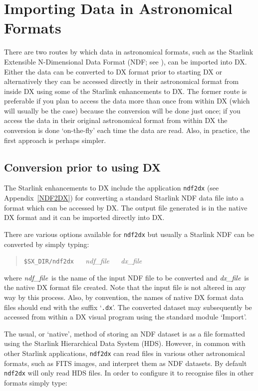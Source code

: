 \section{Importing Data in Astronomical Formats
\label{IMPORTING}  }

There are two routes by which data in astronomical formats, such
as the Starlink Extensible N-Dimensional Data Format (NDF; see 
\cite{SUN33}), can be imported into DX. Either the
data can be converted to DX format prior to starting DX or alternatively
they can be accessed directly in their astronomical format from inside DX
using some of the Starlink enhancements to DX. The former route is
preferable if you plan to access the data more than once from within DX
(which will usually be the case) because the conversion will be done just
once; if you access the data in their original astronomical format from
within DX the conversion is done `on-the-fly' each time the data are read.
Also, in practice, the first approach is perhaps simpler.

\subsection{Conversion prior to using DX \label{PRIOR} }

The Starlink enhancements to DX include the application {\tt ndf2dx} (see
Appendix~\ref{NDF2DX}) for converting a standard Starlink NDF data file
into a format which can be accessed by DX. The output file generated is
in the native DX format and it can be imported directly into DX.

There are various options available for {\tt ndf2dx} 
but usually a Starlink NDF can be
converted by simply typing:

\begin{quote}
{\tt \$SX\_DIR/ndf2dx} ~~ {\it ndf\_file} ~~ {\it dx\_file}
\end{quote}

where {\it ndf\_file}\, is the name of the input NDF file to be
converted and  {\it dx\_file}\, is the native DX format file created.
Note that the input file is not altered in any way by this process.
Also, by convention, the names of native DX format data files should end
with the suffix `{\tt .dx}'. The converted dataset may subsequently be
accessed from within a DX visual program using the standard module
`Import'.

The usual, or `native', method of storing an NDF dataset is as a file
formatted using the Starlink Hierarchical Data System (HDS). However,
in common with other Starlink applications, {\tt ndf2dx} can read 
files in various other astronomical formats, such as FITS images, and
interpret them as NDF datasets. By default {\tt ndf2dx} will only
read HDS files. In order to configure it to recognise files in other
formats simply type:

